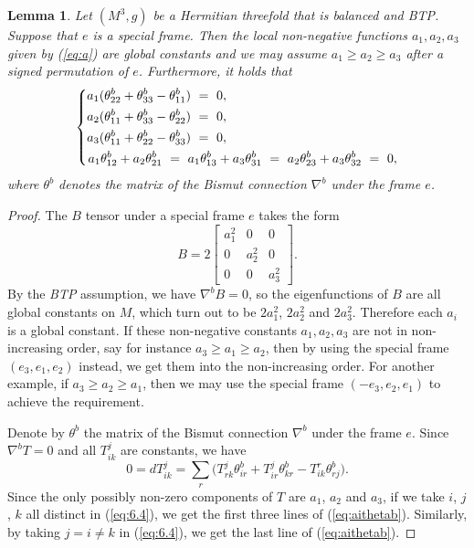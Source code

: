 \documentclass{amsart}
\numberwithin{equation}{section}
\newtheorem{lemma}  [theorem]     {Lemma}
\theoremstyle{definition}
\renewcommand{\1}{\mathds{1}}
\renewcommand{\>}{\rightarrow}
\begin{document}
\begin{lemma} \label{lemmaB}
Let $(M^3,g)$ be a Hermitian threefold that is balanced and BTP. Suppose that $e$ is a special frame. Then the local non-negative functions $a_1, a_2, a_3$ given by (\ref{eq:a}) are global constants and we may assume $a_1 \geq a_2 \geq a_3$ after a signed permutation of $e$.
Furthermore, it holds that
\begin{equation} \label{eq:aithetab}
\left\{ \begin{split}  a_1(\theta^b_{22}+\theta^b_{33} - \theta^b_{11} ) \ = \ 0,  \hspace{4.7cm} \\
 a_2(\theta^b_{11}+\theta^b_{33} - \theta^b_{22} ) \ = \ 0 , \hspace{4.7cm} \\
 a_3( \theta^b_{11}+\theta^b_{22} - \theta^b_{33} ) \ =  \ 0 , \hspace{4.7cm} \\
 a_1\theta^b_{12}+a_2\theta^b_{21} \ =\  a_1\theta^b_{13}+a_3\theta^b_{31} \ = \ a_2\theta^b_{23}+a_3\theta^b_{32} \ = \ 0,
 \end{split} \right.
\end{equation}
where $\theta^b$ denotes the matrix of the Bismut connection $\nabla^b$ under the frame $e$.
\end{lemma}

\begin{proof}
The $B$ tensor under a special frame $e$ takes the form
$$ B = 2 \begin{bmatrix} a_1^2 & 0 & 0 \\ 0 & a_2^2 & 0 \\ 0 & 0 & a_3^2 \end{bmatrix}\!\!.$$
By the {\em BTP} assumption, we have $\nabla^bB=0$, so the eigenfunctions of $B$ are all global constants on $M$,
which turn out to be $2a_1^2$, $2a_2^2$ and $2a_3^2$. Therefore each $a_i$ is a global constant. If these
 non-negative constants $a_1,a_2,a_3$ are not in non-increasing order, say for instance $a_3 \geq a_1 \geq a_2$, then by using the special frame $(e_3,e_1,e_2)$ instead, we get them into the non-increasing order. For another example, if $a_3 \geq a_2 \geq a_1$, then we may use the special frame $(-e_3,e_2,e_1)$ to achieve the requirement.

Denote by $\theta^b$ the matrix of the Bismut connection $\nabla^b$ under the frame $e$. Since $\nabla^bT=0$ and all $T^j_{ik}$ are constants, we have
\begin{equation}
0 = dT^j_{ik} =  \sum_r \big( T^j_{rk} \theta^b_{ir} + T^j_{ir} \theta^b_{kr} - T^r_{ik} \theta^b_{rj} \big).   \label{eq:6.4}
\end{equation}
Since the only possibly non-zero components of $T$ are $a_1$, $a_2$ and $a_3$, if we take $i$, $j$, $k$ all distinct in (\ref{eq:6.4}), we get the first three lines of (\ref{eq:aithetab}). Similarly, by taking $j=i \neq k$ in (\ref{eq:6.4}), we get the last line of (\ref{eq:aithetab}).
\end{proof}
\end{document}
